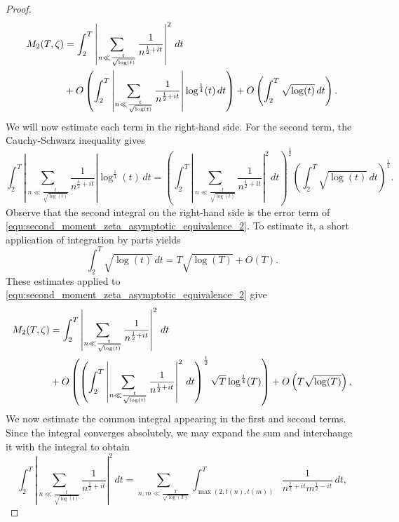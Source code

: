 \begin{proof}
      \begin{equation}\label{equ:second_moment_zeta_asymptotic_equivalence_2}
        \begin{aligned}
          M_{2}(T,\zeta) &= \int_{2}^{T}\left|\sum_{n \ll \frac{t}{\sqrt{\log(t)}}}\frac{1}{n^{\frac{1}{2}+it}}\right|^{2}\,dt \\
          &+ O\left(\int_{2}^{T}\left|\sum_{n \ll \frac{t}{\sqrt{\log(t)}}}\frac{1}{n^{\frac{1}{2}+it}}\right|\log^{\frac{1}{4}}(t)\,dt\right)+O\left(\int_{2}^{T}\sqrt{\log(t)}\,dt\right).
        \end{aligned}
      \end{equation}
      We will now estimate each term in the right-hand side. For the second term, the Cauchy-Schwarz inequality gives
      \[
        \int_{2}^{T}\left|\sum_{n \ll \frac{t}{\sqrt{\log(t)}}}\frac{1}{n^{\frac{1}{2}+it}}\right|\log^{\frac{1}{4}}(t)\,dt = \left(\int_{2}^{T}\left|\sum_{n \ll \frac{t}{\sqrt{\log(t)}}}\frac{1}{n^{\frac{1}{2}+it}}\right|^{2}\,dt\right)^{\frac{1}{2}}\left(\int_{2}^{T}\sqrt{\log(t)}\,dt\right)^{\frac{1}{2}}.
      \]
      Observe that the second integral on the right-hand side is the error term of \cref{equ:second_moment_zeta_asymptotic_equivalence_2}. To estimate it, a short application of integration by parts yields
      \[
        \int_{2}^{T}\sqrt{\log(t)}\,dt = T\sqrt{\log(T)}+O(T).
      \]
      These estimates applied to \cref{equ:second_moment_zeta_asymptotic_equivalence_2} give
      \begin{equation}\label{equ:second_moment_zeta_asymptotic_equivalence_3}
        \begin{aligned}
          M_{2}(T,\zeta) &= \int_{2}^{T}\left|\sum_{n \ll \frac{t}{\sqrt{\log(t)}}}\frac{1}{n^{\frac{1}{2}+it}}\right|^{2}\,dt \\
          &+ O\left(\left(\int_{2}^{T}\left|\sum_{n \ll \frac{t}{\sqrt{\log(t)}}}\frac{1}{n^{\frac{1}{2}+it}}\right|^{2}\,dt\right)^{\frac{1}{2}}\sqrt{T}\log^{\frac{1}{4}}(T)\right)+O\left(T\sqrt{\log(T)}\right).
        \end{aligned}
      \end{equation}
      We now estimate the common integral appearing in the first and second terms. Since the integral converges absolutely, we may expand the sum and interchange it with the integral to obtain
      \[
        \int_{2}^{T}\left|\sum_{n \ll \frac{t}{\sqrt{\log(t)}}}\frac{1}{n^{\frac{1}{2}+it}}\right|^{2}\,dt = \sum_{n,m \ll \frac{T}{\sqrt{\log(T)}}}\int_{\max(2,t(n),t(m))}^{T}\frac{1}{n^{\frac{1}{2}+it}m^{\frac{1}{2}-it}}\,dt,
\]
\end{proof}
